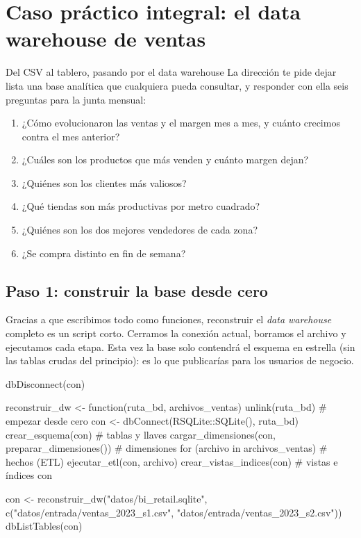 \section{Caso práctico integral: el data warehouse de ventas}
\label{sec:m5-caso}

\begin{ejemplo}{Del CSV al tablero, pasando por el data warehouse}
La dirección te pide dejar lista una base analítica que cualquiera pueda
consultar, y responder con ella seis preguntas para la junta mensual:
\begin{enumerate}
  \item ¿Cómo evolucionaron las ventas y el margen mes a mes, y cuánto
        crecimos contra el mes anterior?
  \item ¿Cuáles son los productos que más venden y cuánto margen dejan?
  \item ¿Quiénes son los clientes más valiosos?
  \item ¿Qué tiendas son más productivas por metro cuadrado?
  \item ¿Quiénes son los dos mejores vendedores de cada zona?
  \item ¿Se compra distinto en fin de semana?
\end{enumerate}
\end{ejemplo}

\subsection{Paso 1: construir la base desde cero}

Gracias a que escribimos todo como funciones, reconstruir el \emph{data
warehouse} completo es un script corto. Cerramos la conexión actual,
borramos el archivo y ejecutamos cada etapa. Esta vez la base solo
contendrá el esquema en estrella (sin las tablas crudas del principio): es
lo que publicarías para los usuarios de negocio.

\begin{rcode}
dbDisconnect(con)

reconstruir_dw <- function(ruta_bd, archivos_ventas) {
  unlink(ruta_bd)                                 # empezar desde cero
  con <- dbConnect(RSQLite::SQLite(), ruta_bd)
  crear_esquema(con)                              # tablas y llaves
  cargar_dimensiones(con, preparar_dimensiones()) # dimensiones
  for (archivo in archivos_ventas) {              # hechos (ETL)
    ejecutar_etl(con, archivo)
  }
  crear_vistas_indices(con)                       # vistas e índices
  con
}

con <- reconstruir_dw("datos/bi_retail.sqlite",
                      c("datos/entrada/ventas_2023_s1.csv",
                        "datos/entrada/ventas_2023_s2.csv"))
dbListTables(con)
\end{rcode}

